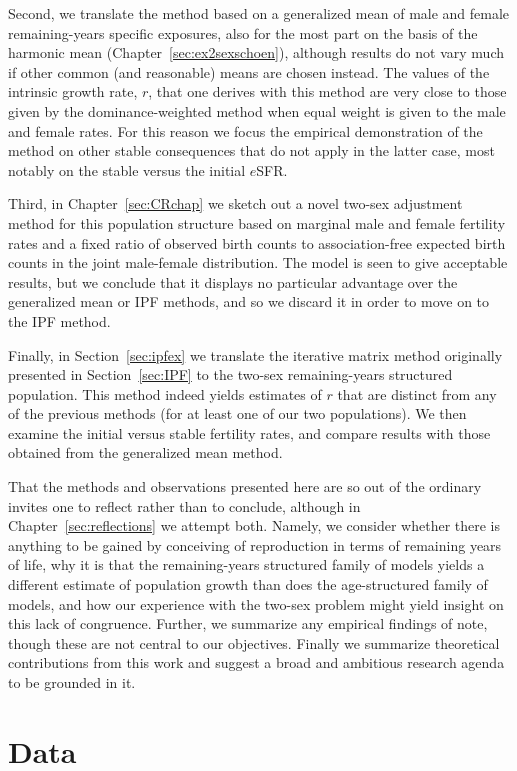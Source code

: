 Second, we translate the
method based on a generalized mean of male and female
remaining-years specific exposures, also for the most part on the basis of the
harmonic mean (Chapter~\ref{sec:ex2sexschoen}), although results do not vary
much if other common (and reasonable) means are chosen instead. The values of
the intrinsic growth rate, $r$, that one derives with this method are very close
to those given by the dominance-weighted method when equal weight is given to
the male and female rates. For this reason we focus the empirical
demonstration of the method on other stable consequences that do not apply in
the latter case, most notably on the stable versus the initial $e$SFR.

Third, in Chapter~\ref{sec:CRchap} we sketch out a novel two-sex adjustment
method for this population structure based on marginal male and female fertility
rates and a fixed ratio of observed birth counts to association-free expected
birth counts in the joint male-female distribution. The model is seen to give
acceptable results, but we conclude that it displays no particular advantage
over the generalized mean or IPF methods, and so we discard it in order to move
on to the IPF method.

Finally, in Section~\ref{sec:ipfex} we translate the iterative matrix method
originally presented in Section~\ref{sec:IPF} to the two-sex remaining-years
structured population. This method indeed yields estimates of $r$ that are distinct from
any of the previous methods (for at least one of our two populations). We then
examine the initial versus stable fertility rates, and compare results with
those obtained from the generalized mean method.

That the methods and observations presented here are so out of the ordinary
invites one to reflect rather than to conclude, although in
Chapter~\ref{sec:reflections} we attempt both. Namely, we consider whether
there is anything to be gained by conceiving of reproduction in terms of 
remaining years of life, why it is that the
remaining-years structured family of models yields a different estimate of
population growth than does the age-structured family of models, and how our
experience with the two-sex problem might yield insight on this lack of
congruence. Further, we summarize any empirical findings of note, though these
are not central to our objectives. Finally we summarize theoretical
contributions from this work and suggest a broad and ambitious research agenda
to be grounded in it.

\section{Data}

